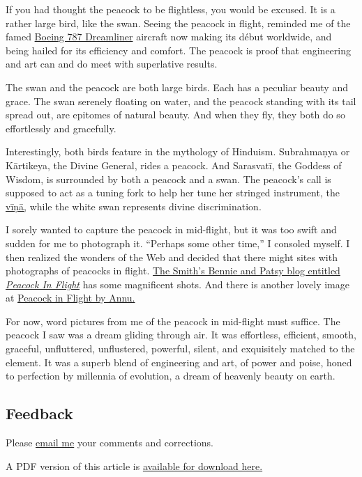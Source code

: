 \documentclass[
  12pt,
  british,
  a4paper,
  rgb,
  dvipsnames,
  svgnames,
  hyphens]{article}
\begin{document}
If you had thought the peacock to be flightless, you would be excused.
It is a rather large bird, like the swan. Seeing the peacock in flight,
reminded me of the famed
\href{http://www.boeing.com/commercial/787family/background.html}{Boeing
787 Dreamliner} aircraft now making its début worldwide, and being
hailed for its efficiency and comfort. The peacock is proof that
engineering and art can and do meet with superlative results.

The swan and the peacock are both large birds. Each has a peculiar
beauty and grace. The swan serenely floating on water, and the peacock
standing with its tail spread out, are epitomes of natural beauty. And
when they fly, they both do so effortlessly and gracefully.

Interestingly, both birds feature in the mythology of Hinduism.
Subrahmaṇya or Kārtikeya, the Divine General, rides a peacock. And
Sarasvatī, the Goddess of Wisdom, is surrounded by both a peacock and a
swan. The peacock's call is supposed to act as a tuning fork to help her
tune her stringed instrument, the
\href{http://www.thefreedictionary.com/vina}{vīṇā,} while the white swan
represents divine discrimination.

I sorely wanted to capture the peacock in mid-flight, but it was too
swift and sudden for me to photograph it. ``Perhaps some other time,'' I
consoled myself. I then realized the wonders of the Web and decided that
there might sites with photographs of peacocks in flight.
\href{http://bennie-thesmiths.blogspot.in/2012/05/peacock-in-flight.html}{The
Smith's Bennie and Patsy blog entitled \emph{Peacock In Flight}} has
some magnificent shots. And there is another lovely image at
\href{http://www.trekearth.com/gallery/Asia/India/West/Rajasthan/Sujangarh/photo772964.htm}{Peacock
in Flight by Annu.}

For now, word pictures from me of the peacock in mid-flight must
suffice. The peacock I saw was a dream gliding through air. It was
effortless, efficient, smooth, graceful, unfluttered, unflustered,
powerful, silent, and exquisitely matched to the element. It was a
superb blend of engineering and art, of power and poise, honed to
perfection by millennia of evolution, a dream of heavenly beauty on
earth.

\hypertarget{feedback}{%
\subsection{Feedback}\label{feedback}}

Please \href{mailto:feedback.swanlotus@gmail.com}{email me} your
comments and corrections.

\noindent A PDF version of this article is
\href{./a-peacock-in-midflight.pdf}{available for download here.}
\end{document}
